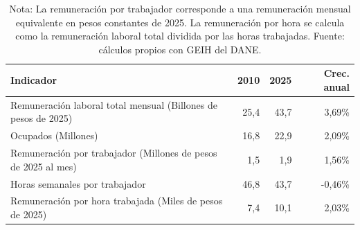 \begin{table}[H]
\centering
\caption{Remuneración laboral, ocupados, horas y remuneración por hora, 2010--2025}
\label{tab:remuneracion_geih_agregado}
\small
\begin{tabular}{@{}p{8.4cm}rrr@{}}
\toprule
Indicador & 2010 & 2025 & Crec. anual \\
\midrule
Remuneración laboral total mensual (Billones de pesos de 2025) & 25,4 & 43,7 & 3,69\% \\
Ocupados (Millones) & 16,8 & 22,9 & 2,09\% \\
Remuneración por trabajador (Millones de pesos de 2025 al mes) & 1,5 & 1,9 & 1,56\% \\
Horas semanales por trabajador & 46,8 & 43,7 & -0,46\% \\
Remuneración por hora trabajada (Miles de pesos de 2025) & 7,4 & 10,1 & 2,03\% \\
\bottomrule
\end{tabular}
\caption*{\footnotesize Nota: La remuneración por trabajador corresponde a una remuneración mensual equivalente en pesos constantes de 2025. La remuneración por hora se calcula como la remuneración laboral total dividida por las horas trabajadas. Fuente: cálculos propios con GEIH del DANE.}
\end{table}

